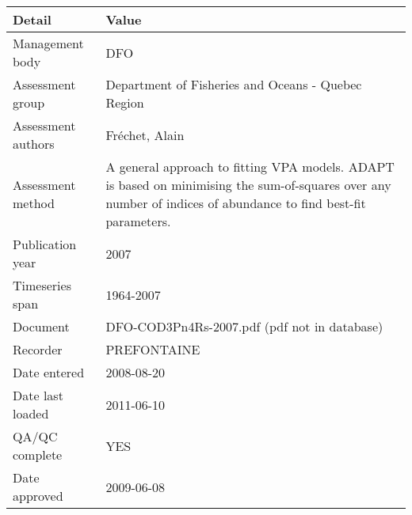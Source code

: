 \begin{table}[htb]
\centering
\begin{tabular}{lp{7cm}}
\toprule
Detail & Value \\
\midrule
Management body    & DFO                                                                                                                                                            \\
Assessment group   & Department of Fisheries and Oceans - Quebec Region                                                                                                             \\
Assessment authors & Fr\'{e}chet, Alain                                                                                                                                             \\
Assessment method  & A general approach to fitting VPA models. ADAPT is based on minimising the sum-of-squares over any number of indices of abundance to find best-fit parameters. \\
Publication year   & 2007                                                                                                                                                           \\
Timeseries span    & 1964-2007                                                                                                                                                      \\
Document           & DFO-COD3Pn4Rs-2007.pdf (pdf not in database)                                                                                                                   \\
Recorder           & PREFONTAINE                                                                                                                                                    \\
Date entered       & 2008-08-20                                                                                                                                                     \\
Date last loaded   & 2011-06-10                                                                                                                                                     \\
QA/QC complete     & YES                                                                                                                                                            \\
Date approved      & 2009-06-08                                                                                                                                                     \\
\bottomrule
\end{tabular}
\label{tab:assessdet}
\end{table}
